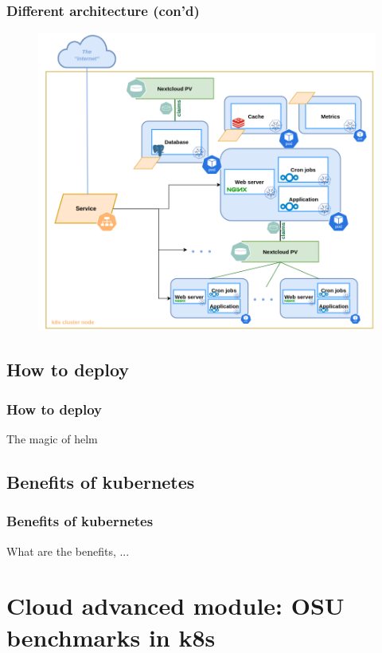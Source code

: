 \documentclass{beamer}
\begin{document}
\begin{frame}
    \frametitle{Different architecture (con'd)}
    \begin{figure}
        \includegraphics[height=0.85\textheight]{images/other/exadvanceddiagram}
    \end{figure}
\end{frame}

\subsection{How to deploy}
\begin{frame}
    \frametitle{How to deploy}
    The magic of helm
\end{frame}

\subsection{Benefits of kubernetes}
\begin{frame}
    \frametitle{Benefits of kubernetes}
    What are the benefits, ...
\end{frame}



\section{Cloud \textbf{advanced} module: OSU benchmarks in k8s}
\end{document}
